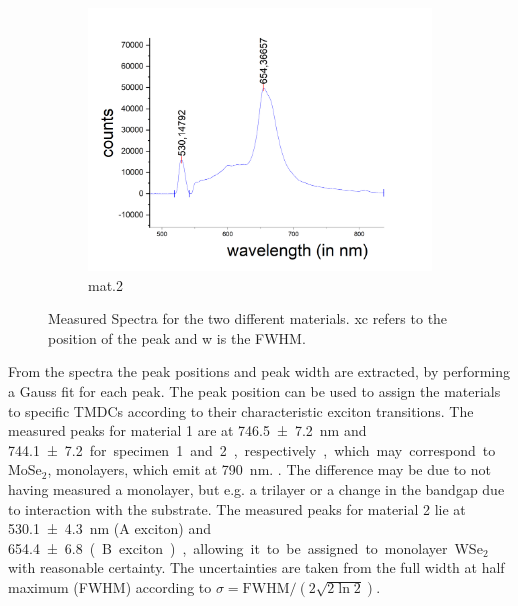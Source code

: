 \begin{figure}[H]
\begin{subfigure}{0.6\textwidth}
        \centering
        \includegraphics[width=\textwidth]{img/output_t1/spekt_m2}
        \caption{mat.2}
	      \label{fig_mono_spec3_1dspec}
    \end{subfigure}
    \caption{Measured Spectra for the two different materials. xc refers to the position of the peak and w is the FWHM.}
	\label{fig_mono_1dspectra} %
\end{figure}

From the spectra the peak positions and peak width are extracted, by performing a Gauss fit for each peak.
The peak position can be used to assign the materials to specific TMDCs according to their characteristic exciton transitions.
The measured peaks for material 1 are at \SI{746,5\pm 7,2}{nm} and \SI{744,1 \pm 7,2} for specimen 1 and 2, respectively, which may correspond to MoSe$_2$, monolayers, which emit at \SI{790}{nm}. \cite{Tonndorf2013}.
The difference may be due to not having measured a monolayer, but e.g. a trilayer or a change in the bandgap due to interaction with the substrate.
The measured peaks for material 2 lie at \SI{530,1 \pm 4,3}{nm} (A exciton) and \SI{654,4 \pm 6,8} (B exciton), allowing it to be assigned to monolayer WSe$_2$ with reasonable certainty.
The uncertainties are taken from the full width at half maximum (FWHM) according to $\sigma = \mathrm{FWHM}/(2\sqrt{2 \ln 2})$.
